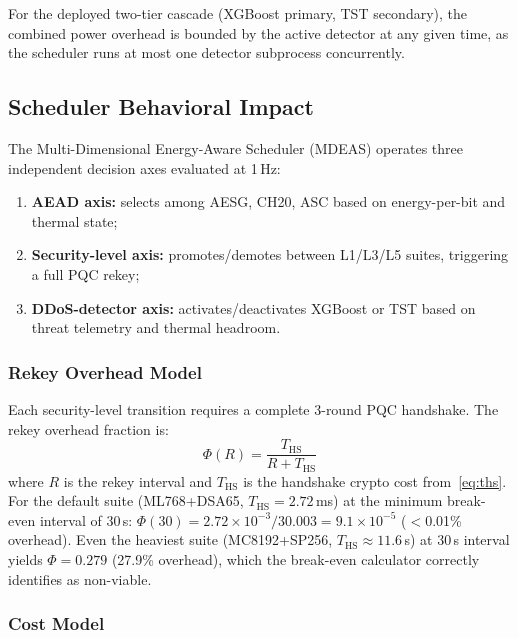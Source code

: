 For the deployed two-tier cascade (XGBoost primary, TST secondary),
the combined power overhead is bounded by the active detector at any
given time, as the scheduler runs at most one detector subprocess
concurrently.

\subsection{Scheduler Behavioral Impact}
\label{sec:scheduler}

The Multi-Dimensional Energy-Aware Scheduler (MDEAS) operates three
independent decision axes evaluated at 1\,Hz:

\begin{enumerate}
\item \textbf{AEAD axis:} selects among AESG, CH20, ASC based on
  energy-per-bit and thermal state;
\item \textbf{Security-level axis:} promotes/demotes between L1/L3/L5
  suites, triggering a full PQC rekey;
\item \textbf{DDoS-detector axis:} activates/deactivates XGBoost or
  TST based on threat telemetry and thermal headroom.
\end{enumerate}

\subsubsection{Rekey Overhead Model}

Each security-level transition requires a complete 3-round PQC
handshake.  The rekey overhead fraction is:
\begin{equation}
\Phi(R) = \frac{T_\text{HS}}{R + T_\text{HS}}
\label{eq:rekey}
\end{equation}
where $R$ is the rekey interval and $T_\text{HS}$ is the handshake
crypto cost from~\eqref{eq:ths}.  For the default suite (ML768+DSA65,
$T_\text{HS} = 2.72$\,ms) at the minimum break-even interval of 30\,s:
$\Phi(30) = 2.72 \times 10^{-3} / 30.003 = 9.1 \times 10^{-5}$
($<$0.01\% overhead).  Even the heaviest suite (MC8192+SP256,
$T_\text{HS} \approx 11.6$\,s) at 30\,s interval yields
$\Phi = 0.279$ (27.9\% overhead), which the break-even calculator
correctly identifies as non-viable.

\subsubsection{Cost Model}

